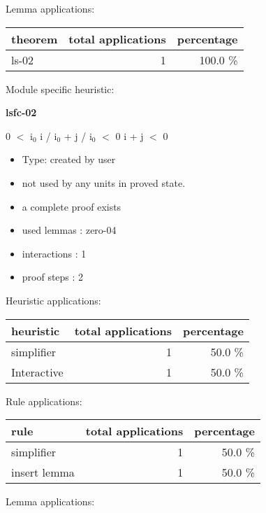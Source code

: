 \documentclass[a4paper]{article}
\begin{document}
Lemma applications:

\begin{supertabular}{l|r|r}
theorem	        & total applications & percentage \\ \hline
ls-02 & 1 & 100.0 \% \\

\end{supertabular}

Module specific heuristic:

\pagebreak

{\LARGE\bf lsfc-02}\label{lemma-lsfc-02}

\medskip

0 $<$ $\mbox{i}_{0}$ \Fol i / $\mbox{i}_{0}$ + j / $\mbox{i}_{0}$ $<$ 0 \Imp i + j $<$ 0

\begin{itemize}

\item Type: created by user

\item not used by any units in proved state.
\item       a complete proof exists
\item       used lemmas  : zero-04
\item       interactions : 1
\item       proof steps  : 2
\end{itemize}

\medskip


Heuristic applications:

\begin{supertabular}{l|r|r}
heuristic	& total applications & percentage \\ \hline
simplifier & 1 & 50.0 \% \\
Interactive & 1 & 50.0 \% \\

\end{supertabular}

Rule applications:

\begin{supertabular}{l|r|r}
rule	        & total applications & percentage \\ \hline
simplifier & 1 & 50.0 \% \\
insert lemma & 1 & 50.0 \% \\

\end{supertabular}

Lemma applications:
\end{document}
